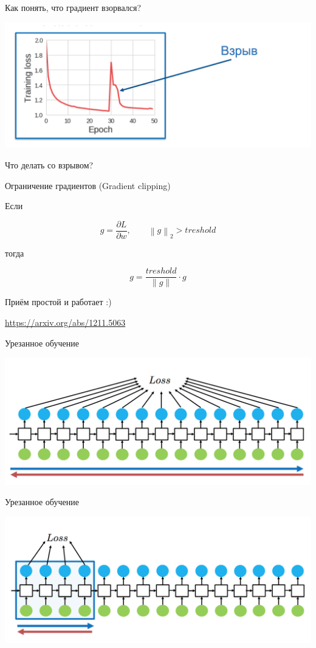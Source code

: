 \documentclass[notes,12pt, aspectratio=169]{beamer}
\begin{document}
\begin{frame}{Как понять, что градиент взорвался?}
\begin{center}
	\includegraphics[width=.9\linewidth]{rnn9.png}
\end{center}
Что делать со взрывом? 
\end{frame}


\begin{frame}{Ограничение градиентов (Gradient clipping)}

Если  

\[
g = \frac{\partial L}{\partial w},  \qquad \left\| g \right\|_2 > treshold 
\]

тогда 

\[
g = \frac{treshold}{\|g\|} \cdot g
\]

\alert{Приём простой и работает :)}

\vfill 
\footnotesize 
\color{blue} \url{https://arxiv.org/abs/1211.5063} 
\end{frame}


\begin{frame}{Урезанное обучение}
\begin{center}
	\includegraphics[width=.9\linewidth]{rnn10.png}
\end{center}
\end{frame}


\begin{frame}{Урезанное обучение}
\begin{center}
	\includegraphics[width=.9\linewidth]{rnn11.png}
\end{center}
\end{frame}
\end{document}
